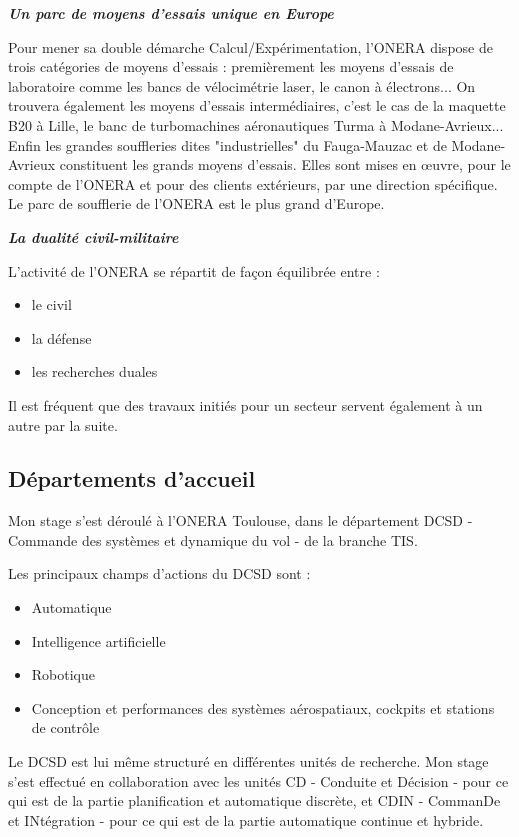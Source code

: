 \textit{\textbf{Un parc de moyens d'essais unique en Europe}}


Pour mener sa double démarche Calcul/Expérimentation, l'ONERA dispose de trois catégories de moyens d'essais : premièrement les moyens d'essais de laboratoire comme les bancs de vélocimétrie laser, le canon à électrons... On trouvera également les moyens d'essais intermédiaires, c'est le cas de la maquette B20 à Lille, le banc de turbomachines aéronautiques Turma à Modane-Avrieux... Enfin les grandes souffleries dites "industrielles" du Fauga-Mauzac et de Modane-Avrieux constituent les grands moyens d'essais. Elles sont mises en œuvre, pour le compte de l'ONERA et pour des clients extérieurs, par une direction spécifique. Le parc de soufflerie de l'ONERA est le plus grand d'Europe.

\textit{\textbf{La dualité civil-militaire}}

L'activité de l'ONERA se répartit de façon équilibrée entre :
\begin{itemize}
	\item le civil
	\item la défense
	\item les recherches duales
\end{itemize}
Il est fréquent que des travaux initiés pour un secteur servent également à un autre par la suite.

\subsection{Départements d'accueil}

Mon stage s'est déroulé à l'ONERA Toulouse, dans le département DCSD - Commande des systèmes et dynamique du vol - de la branche TIS.

Les principaux champs d'actions du DCSD sont : 
\begin{itemize}
	\item Automatique
	\item Intelligence artificielle
	\item Robotique
	\item Conception et performances des systèmes aérospatiaux, cockpits et stations de contrôle
\end{itemize}

Le DCSD est lui même structuré en différentes unités de recherche. Mon stage s'est effectué en collaboration avec les unités CD - Conduite et Décision - pour ce qui est de la partie planification et automatique discrète, et CDIN - CommanDe et INtégration - pour ce qui est de la partie automatique continue et hybride.